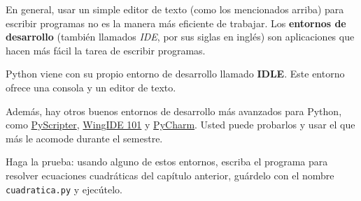 En general, usar un simple editor de texto (como los mencionados arriba)
para escribir programas no es la manera más eficiente de trabajar.
Los \textbf{entornos de desarrollo} (también llamados \emph{IDE}, por
sus siglas en inglés) son aplicaciones que hacen más fácil la tarea de
escribir programas.

Python viene con su propio entorno de desarrollo llamado \textbf{IDLE}.
Este entorno ofrece una consola y un editor de texto.

Además, hay otros buenos entornos de desarrollo más avanzados para
Python, como
\href{http://code.google.com/p/pyscripter/downloads/list}{PyScripter},
\href{http://www.wingware.com/downloads/wingide-101/3.2.12-1/binaries}{WingIDE 101} y
\href{http://www.jetbrains.com/pycharm/}{PyCharm}.
Usted puede probarlos y usar el que más le acomode durante el
semestre.

Haga la prueba:
usando alguno de estos entornos,
escriba el programa para resolver ecuaciones cuadráticas
del capítulo anterior,
guárdelo con el nombre \verb!cuadratica.py! y ejecútelo.

